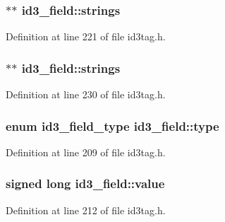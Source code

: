 \subsubsection[{\texorpdfstring{strings}{strings}}]{$\ast$$\ast$ id3\+\_\+field\+::strings}\hypertarget{unionid3__field_aa15b7e30355a3f3ac9272bac985039f7}{}\label{unionid3__field_aa15b7e30355a3f3ac9272bac985039f7}


Definition at line 221 of file id3tag.\+h.

\subsubsection[{\texorpdfstring{strings}{strings}}]{$\ast$$\ast$ id3\+\_\+field\+::strings}\hypertarget{unionid3__field_a5d3dbc480ce1ea7ec620888b953c64ad}{}\label{unionid3__field_a5d3dbc480ce1ea7ec620888b953c64ad}


Definition at line 230 of file id3tag.\+h.

\subsubsection[{\texorpdfstring{type}{type}}]{\setlength{\rightskip}{0pt plus 5cm}enum {\bf id3\+\_\+field\+\_\+type} id3\+\_\+field\+::type}\hypertarget{unionid3__field_a3fd3df5b89abdcfc671708c145564c75}{}\label{unionid3__field_a3fd3df5b89abdcfc671708c145564c75}


Definition at line 209 of file id3tag.\+h.

\subsubsection[{\texorpdfstring{value}{value}}]{\setlength{\rightskip}{0pt plus 5cm}signed long id3\+\_\+field\+::value}\hypertarget{unionid3__field_ade4486e524b5bd80a0833f26e6868392}{}\label{unionid3__field_ade4486e524b5bd80a0833f26e6868392}


Definition at line 212 of file id3tag.\+h.

